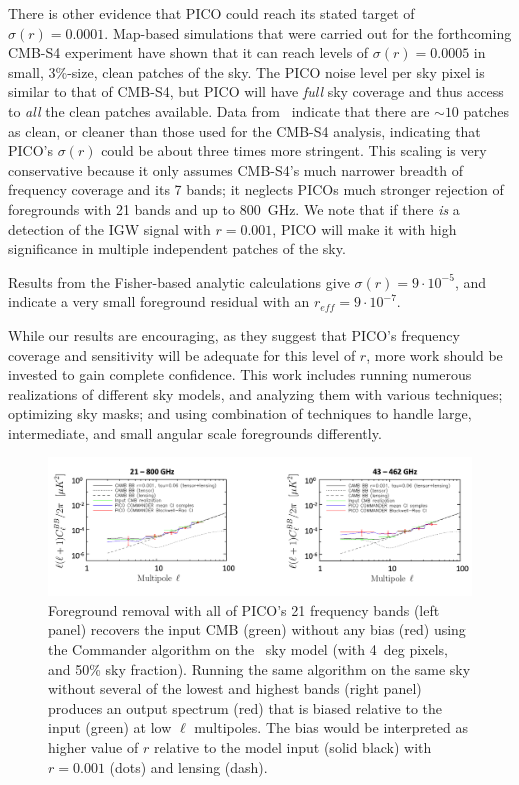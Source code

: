 \documentclass[PICOReport.tex]{subfiles}
\begin{document}
There is other evidence that PICO could reach its stated target of $\sigma(r) = 0.0001$. Map-based simulations that were carried out for the forthcoming CMB-S4 experiment have shown that it can reach levels of $\sigma(r) = 0.0005$ in small, 3\%-size, clean patches of the sky. 
The PICO noise level per sky pixel is similar to that of CMB-S4, but PICO will have {\it full} sky coverage and thus access to {\it all} the clean patches available. Data from \planck\ indicate that there are $\sim10$ %
patches as clean, or cleaner than those used for the CMB-S4 analysis, indicating that PICO's $\sigma(r)$ could be about three times more stringent. This scaling is very conservative because it only assumes CMB-S4's much narrower breadth of frequency coverage and its 7 bands; %
it neglects PICOs much stronger rejection of foregrounds with 21 bands and up to 800~GHz.  We note that if there {\it is} a detection of the \ac{IGW} signal with $r=0.001$, PICO will make it with high significance in multiple independent patches of the sky. 

Results from the Fisher-based analytic calculations give $\sigma(r) = 9 \cdot 10^{-5}$, and indicate a very small foreground residual with an $r_{eff} = 9 \cdot 10^{-7}.$

While our results are encouraging, as they suggest that PICO's frequency coverage and sensitivity will be adequate for this level of $r$, more work should be invested to gain complete confidence. This work includes running numerous realizations of different sky models, and analyzing them with various techniques; optimizing sky masks; and using combination of techniques to handle large, intermediate, and small angular scale foregrounds differently. 
\begin{figure}
{\centerline {
\includegraphics[width=4.5in]{images/commander_foregrounds_BB.png} }}
\caption{\captiontext
Foreground removal with all of PICO's 21 frequency bands (left panel) recovers the input CMB (green) without any bias (red) using the Commander algorithm on the \planck\ sky model (with 4~deg pixels, and 50\% sky fraction). Running the same algorithm on the same sky without several of the lowest and highest bands (right panel) produces an output spectrum (red) that is biased relative to the input (green) at low $\ell$ multipoles. The bias would be interpreted as higher value of $r$ relative to the model input (solid black) with $r=0.001$ (dots) and lensing (dash). 
\label{fig:commander}}
\vspace{-0.0in}
\end{figure}
\end{document}
